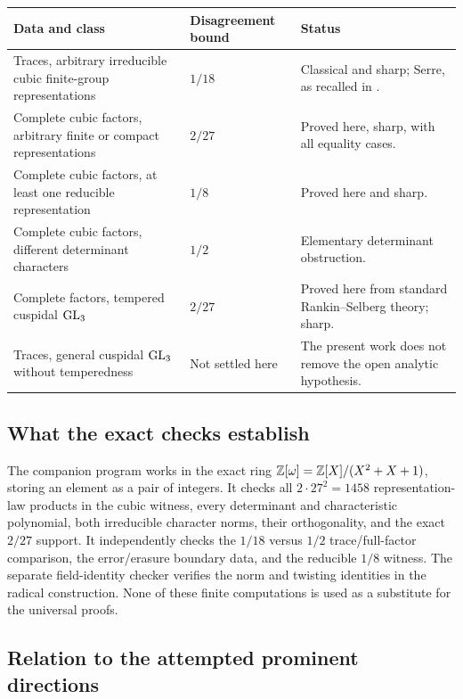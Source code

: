 \documentclass[11pt]{article}
\theoremstyle{definition}\newtheorem{definition}[theorem]{Definition}
\theoremstyle{remark}\newtheorem{remark}[theorem]{Remark}
\newcommand{\pathcode}[1]{\texttt{\detokenize{#1}}}
\begin{document}
\begin{center}\small
\begin{tabularx}{\linewidth}{@{}>{\raggedright\arraybackslash}p{.43\linewidth}>{\raggedright\arraybackslash}p{.18\linewidth}>{\raggedright\arraybackslash}X@{}}\toprule
Data and class & Disagreement bound & Status\\\midrule
Traces, arbitrary irreducible cubic finite-group representations & $1/18$ & Classical and sharp; Serre, as recalled in \cite{MartinWalji}.\\
Complete cubic factors, arbitrary finite or compact representations & $2/27$ & Proved here, sharp, with all equality cases.\\
Complete cubic factors, at least one reducible representation & $1/8$ & Proved here and sharp.\\
Complete cubic factors, different determinant characters & $1/2$ & Elementary determinant obstruction.\\
Complete factors, tempered cuspidal $\mathrm{GL}_3$ & $2/27$ & Proved here from standard Rankin--Selberg theory; sharp.\\
Traces, general cuspidal $\mathrm{GL}_3$ without temperedness & Not settled here & The present work does not remove the open analytic hypothesis.\\\bottomrule
\end{tabularx}
\end{center}

\subsection{What the exact checks establish}

The companion program \pathcode{code/verify_exact.py} works in the exact ring
$\mathbb Z[\omega]=\mathbb Z[X]/(X^2+X+1)$, storing an element as a pair of integers. It checks all $2\cdot27^2=1458$ representation-law products in the cubic witness, every determinant and characteristic polynomial, both irreducible character norms, their orthogonality, and the exact $2/27$ support. It independently checks the $1/18$ versus $1/2$ trace/full-factor comparison, the error/erasure boundary data, and the reducible $1/8$ witness. The separate field-identity checker verifies the norm and twisting identities in the radical construction. None of these finite computations is used as a substitute for the universal proofs.

\subsection{Relation to the attempted prominent directions}
\end{document}
